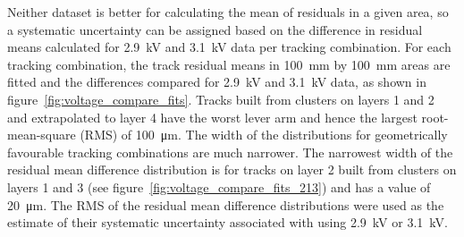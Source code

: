 Neither dataset is better for calculating the mean of residuals in a given area, so a systematic uncertainty can be assigned based on the difference in residual means calculated for 2.9~kV and 3.1~kV data per tracking combination. For each tracking combination, the track residual means in \SI{100}{mm} by \SI{100}{mm} areas are fitted and the differences compared for 2.9~kV and 3.1~kV data, as shown in figure~\ref{fig:voltage_compare_fits}. Tracks built from clusters on layers 1 and 2 and extrapolated to layer 4 have the worst lever arm and hence the largest root-mean-square (RMS) of \SI{100}{\micro\meter}. The width of the distributions for geometrically favourable tracking combinations are much narrower. The narrowest width of the residual mean difference distribution is for tracks on layer 2 built from clusters on layers 1 and 3 (see figure~\ref{fig:voltage_compare_fits_213}) and has a value of \SI{20}{\micro\meter}. The RMS of the residual mean difference distributions were used as the estimate of their systematic uncertainty associated with using 2.9~kV or 3.1~kV.

